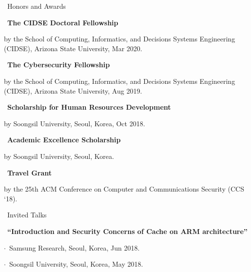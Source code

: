 \documentclass{resume} %
\begin{document}
\begin{rSection}{\faGenderless~Honors and Awards}
    \strut\textbullet~{\bf The CIDSE Doctoral Fellowship}\\
    \strut\hspace{1cm}\parbox[t]{\linegoal}{by the School of Computing, Informatics, and Decisions Systems Engineering (CIDSE), Arizona State University, Mar 2020.}

    \strut\textbullet~{\bf The Cybersecurity Fellowship}\\
    \strut\hspace{1cm}\parbox[t]{\linegoal}{by the School of Computing, Informatics, and Decisions Systems Engineering (CIDSE), Arizona State University, Aug 2019.}

	\strut\textbullet~{\bf Scholarship for Human Resources Development}\\
	\strut\hspace{1cm}by Soongsil University, Seoul, Korea, Oct 2018.


	\strut\textbullet~{\bf Academic Excellence Scholarship}\\
	\strut\hspace{1cm}by Soongsil University, Seoul, Korea.

	\strut\textbullet~{\bf Travel Grant}\\
	\strut\hspace{1cm}by the 25th ACM Conference on Computer and Communications Security (CCS `18).

\end{rSection}


\begin{rSection}{\faGenderless~Invited Talks}

	\strut\textbullet~{\bf ``Introduction and Security Concerns of Cache on ARM architecture''}\\
	\strut\hspace{1cm}$\cdot$~Samsung Research, Seoul, Korea, Jun 2018.\\
	\strut\hspace{1cm}$\cdot$~Soongsil University, Seoul, Korea, May 2018.

\end{rSection}
\vspace{3mm}
\end{document}
